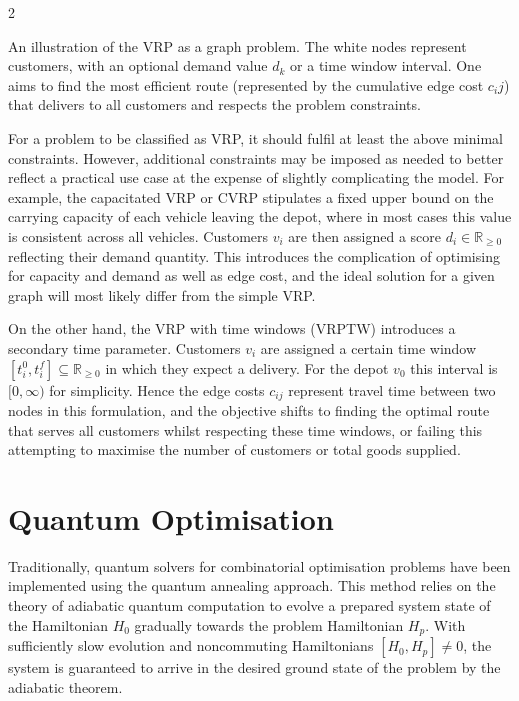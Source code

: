 \documentclass [10pt]{article}
\begin{document}
\begin {multicols}{2}
\vspace {0.3cm}
\begin {center}
	{
	An illustration of the VRP as a graph problem. The white nodes represent
	customers, with an optional demand value $d_k$ or a time window interval.
	One aims to find the most efficient route (represented by the cumulative
	edge cost $c_ij$) that delivers to all customers and respects the problem
	constraints.
}
\end {center}
\vspace {0.3cm}

For a problem to be classified as VRP, it should fulfil at least the above
minimal constraints. However, additional constraints may be imposed as
needed to better reflect a practical use case at the expense of slightly
complicating the model. For example, the capacitated VRP or CVRP stipulates
a fixed upper bound on the carrying capacity of each vehicle leaving the
depot, where in most cases this value is consistent across all vehicles.
Customers $v_i$ are then assigned a score $d_i \in \mathbb R_{\ge 0}$ 
reflecting their demand quantity. This introduces the complication of
optimising for capacity and demand as well as edge cost, and the ideal
solution for a given graph will most likely differ from the simple VRP.

On the other hand, the VRP with time windows (VRPTW) introduces a secondary
time parameter. Customers $v_i$ are assigned a certain time window
$[t_i^0, t_i^f] \subseteq \mathbb R_{\ge 0}$ in which they expect a delivery.
For the depot $v_0$ this interval is $[0, \infty)$ for simplicity. Hence the
edge costs $c_{ij}$ represent travel time between two nodes in this
formulation, and the objective shifts to finding the optimal route that
serves all customers whilst respecting these time windows, or failing this
attempting to maximise the number of customers or total goods supplied.

\section {Quantum Optimisation}
Traditionally, quantum solvers for combinatorial optimisation problems have
been implemented using the quantum annealing approach. This method relies on
the theory of adiabatic quantum computation to evolve a prepared system state
of the Hamiltonian $H_0$ gradually towards the problem Hamiltonian $H_p$. With
sufficiently slow evolution and noncommuting Hamiltonians $[H_0, H_p] \neq 0$,
the system is guaranteed to arrive in the desired ground state of the problem
by the adiabatic theorem.


\end{multicols}
\end{document}
